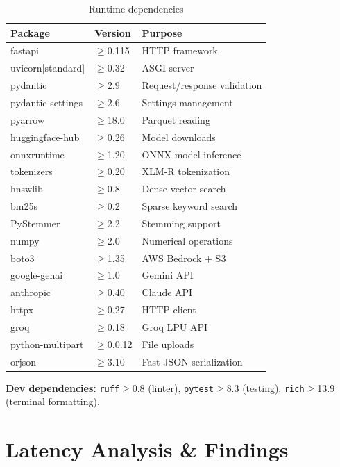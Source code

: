 \documentclass[12pt,a4paper]{article}
\begin{document}
\begin{table}[H]
\centering
\small
\begin{tabular}{llp{7cm}}
\toprule
\textbf{Package} & \textbf{Version} & \textbf{Purpose} \\
\midrule
fastapi           & $\geq$0.115 & HTTP framework \\
uvicorn[standard] & $\geq$0.32  & ASGI server \\
pydantic          & $\geq$2.9   & Request/response validation \\
pydantic-settings & $\geq$2.6   & Settings management \\
pyarrow           & $\geq$18.0  & Parquet reading \\
huggingface-hub   & $\geq$0.26  & Model downloads \\
onnxruntime       & $\geq$1.20  & ONNX model inference \\
tokenizers        & $\geq$0.20  & XLM-R tokenization \\
hnswlib           & $\geq$0.8   & Dense vector search \\
bm25s             & $\geq$0.2   & Sparse keyword search \\
PyStemmer         & $\geq$2.2   & Stemming support \\
numpy             & $\geq$2.0   & Numerical operations \\
boto3             & $\geq$1.35  & AWS Bedrock + S3 \\
google-genai      & $\geq$1.0   & Gemini API \\
anthropic         & $\geq$0.40  & Claude API \\
httpx             & $\geq$0.27  & HTTP client \\
groq              & $\geq$0.18  & Groq LPU API \\
python-multipart  & $\geq$0.0.12 & File uploads \\
orjson            & $\geq$3.10  & Fast JSON serialization \\
\bottomrule
\end{tabular}
\caption{Runtime dependencies}
\end{table}

\textbf{Dev dependencies:} \texttt{ruff}$\geq$0.8 (linter), \texttt{pytest}$\geq$8.3 (testing), \texttt{rich}$\geq$13.9 (terminal formatting).


\section{Latency Analysis \& Findings}
\end{document}
